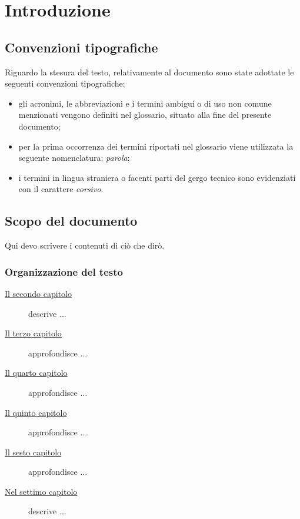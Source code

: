
\chapter{Introduzione}
\label{cap:introduzione}
\section{Convenzioni tipografiche}

Riguardo la stesura del testo, relativamente al documento sono state adottate le seguenti convenzioni tipografiche:
\begin{itemize}
	\item gli acronimi, le abbreviazioni e i termini ambigui o di uso non comune menzionati vengono definiti nel glossario, situato alla fine del presente documento;
	\item per la prima occorrenza dei termini riportati nel glossario viene utilizzata la seguente nomenclatura: \emph{parola}\glsfirstoccur;
	\item i termini in lingua straniera o facenti parti del gergo tecnico sono evidenziati con il carattere \emph{corsivo}.
\end{itemize}

\section{Scopo del documento}
Qui devo scrivere i contenuti di ciò che dirò.


\subsection{Organizzazione del testo}

\begin{description}
    \item[{\hyperref[cap:processi-metodologie]{Il secondo capitolo}}] descrive ...

    \item[{\hyperref[cap:descrizione-stage]{Il terzo capitolo}}] approfondisce ...

    \item[{\hyperref[cap:analisi-requisiti]{Il quarto capitolo}}] approfondisce ...

    \item[{\hyperref[cap:progettazione-codifica]{Il quinto capitolo}}] approfondisce ...

    \item[{\hyperref[cap:verifica-validazione]{Il sesto capitolo}}] approfondisce ...

    \item[{\hyperref[cap:conclusioni]{Nel settimo capitolo}}] descrive ...
\end{description}

